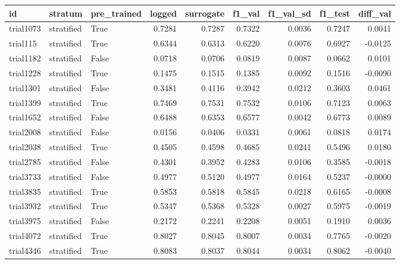 \begin{tabular}{lllrrrrrr}
\toprule
       id &    stratum &  pre\_trained &  logged &  surrogate &  f1\_val &  f1\_val\_sd &  f1\_test &  diff\_val \\
\midrule
trial1073 & stratified &         True &  0.7281 &     0.7287 &  0.7322 &     0.0036 &   0.7247 &    0.0041 \\
 trial115 & stratified &         True &  0.6344 &     0.6313 &  0.6220 &     0.0076 &   0.6927 &   -0.0125 \\
trial1182 & stratified &        False &  0.0718 &     0.0706 &  0.0819 &     0.0087 &   0.0662 &    0.0101 \\
trial1228 & stratified &         True &  0.1475 &     0.1515 &  0.1385 &     0.0092 &   0.1516 &   -0.0090 \\
trial1301 & stratified &        False &  0.3481 &     0.4116 &  0.3942 &     0.0212 &   0.3603 &    0.0461 \\
trial1399 & stratified &         True &  0.7469 &     0.7531 &  0.7532 &     0.0106 &   0.7123 &    0.0063 \\
trial1652 & stratified &        False &  0.6488 &     0.6353 &  0.6577 &     0.0042 &   0.6773 &    0.0089 \\
trial2008 & stratified &        False &  0.0156 &     0.0406 &  0.0331 &     0.0061 &   0.0818 &    0.0174 \\
trial2038 & stratified &         True &  0.4505 &     0.4598 &  0.4685 &     0.0241 &   0.5496 &    0.0180 \\
trial2785 & stratified &        False &  0.4301 &     0.3952 &  0.4283 &     0.0106 &   0.3585 &   -0.0018 \\
trial3733 & stratified &        False &  0.4977 &     0.5120 &  0.4977 &     0.0164 &   0.5237 &   -0.0000 \\
trial3835 & stratified &         True &  0.5853 &     0.5818 &  0.5845 &     0.0218 &   0.6165 &   -0.0008 \\
trial3932 & stratified &         True &  0.5347 &     0.5368 &  0.5328 &     0.0027 &   0.5975 &   -0.0019 \\
trial3975 & stratified &        False &  0.2172 &     0.2241 &  0.2208 &     0.0051 &   0.1910 &    0.0036 \\
trial4072 & stratified &         True &  0.8027 &     0.8045 &  0.8007 &     0.0034 &   0.7765 &   -0.0020 \\
trial4346 & stratified &         True &  0.8083 &     0.8037 &  0.8044 &     0.0034 &   0.8062 &   -0.0040 \\

\end{tabular}
